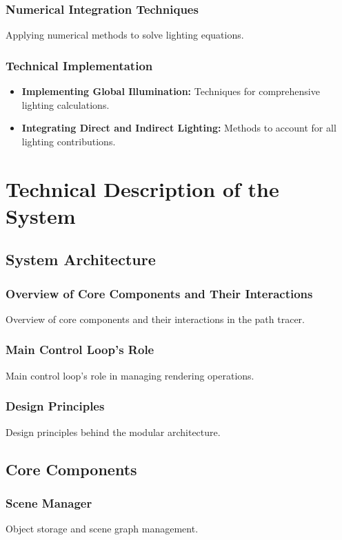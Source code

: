 \documentclass[12pt]{article}
\begin{document}
\subsubsection{Numerical Integration Techniques}
Applying numerical methods to solve lighting equations.
\subsubsection{Technical Implementation}
\begin{itemize}
    \item \textbf{Implementing Global Illumination:} Techniques for comprehensive lighting calculations.
    \item \textbf{Integrating Direct and Indirect Lighting:} Methods to account for all lighting contributions.
\end{itemize}

\section{Technical Description of the System}
\label{sec:system-description}
\subsection{System Architecture}
\subsubsection{Overview of Core Components and Their Interactions}
Overview of core components and their interactions in the path tracer.
\subsubsection{Main Control Loop's Role}
Main control loop's role in managing rendering operations.
\subsubsection{Design Principles}
Design principles behind the modular architecture.

\subsection{Core Components}
\subsubsection{Scene Manager}
Object storage and scene graph management.
\end{document}
